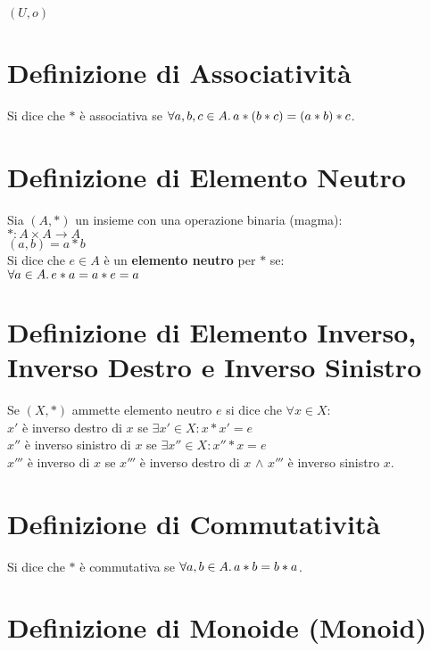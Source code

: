 \documentclass[a4paper, twoside, italian, 11pt]{book}
\begin{document}
$(U, o)$


\section{Definizione di Associatività}

Si dice che $*$ è associativa se $\forall a,b,c \in A \ldotp a * (b * c) = (a * b) * c$.


\section{Definizione di Elemento Neutro}

Sia $(A, *)$ un insieme con una operazione binaria (magma): \\

$* : A \times A \rightarrow A$ \\
\indent
$(a, b) = a * b$ \\

\noindent
Si dice che $e \in A$ è un \textbf{elemento neutro} per $*$ se: \\

$\forall a \in A \ldotp e * a = a * e = a$


\section{Definizione di Elemento Inverso, Inverso Destro e Inverso Sinistro}

Se $(X, *)$ ammette elemento neutro $e$ si dice che $\forall x \in X$: \\

$x'$ è inverso destro di $x$ se $\exists x' \in X : x * x' = e$ \\
\indent
$x''$ è inverso sinistro di $x$ se $\exists x'' \in X : x'' * x = e$ \\
\indent
$x'''$ è inverso di $x$ se $x'''$ è inverso destro di $x$ $\land$ $x'''$ è inverso sinistro $x$.


\section{Definizione di Commutatività}

Si dice che $*$ è commutativa se $\forall a,b \in A \ldotp a * b = b * a$.


\section{Definizione di Monoide (Monoid)}
\end{document}
